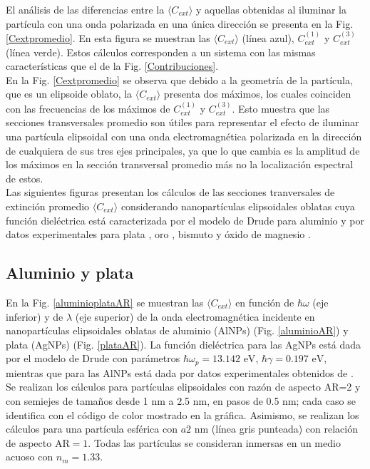 El análisis de las diferencias entre la $\langle C_{ext}\rangle$ y aquellas obtenidas al iluminar la partícula con una onda polarizada en una única dirección se presenta en la Fig. \ref{Cextpromedio}. En esta figura se muestran las $\langle C_{ext}\rangle$ (línea azul), $C_{ext}^{(1)}$ y $C_{ext}^{(3)}$ (línea verde). Estos cálculos corresponden a un sistema con las mismas características que el de la Fig. \ref{Contribuciones}.\\

En la Fig. \ref{Cextpromedio} se observa que debido a la geometría de la partícula, que es un elipsoide oblato, la 
$\langle C_{ext}\rangle$ presenta dos máximos, los cuales coinciden con las frecuencias de los máximos de $C_{ext}^{(1)}$ y $C_{ext}^{(3)}$. Esto muestra que las secciones transversales promedio son útiles para representar el efecto de iluminar una partícula elipsoidal con una onda electromagnética polarizada en la dirección de cualquiera de sus tres ejes principales, ya que lo que cambia es la amplitud de los máximos en la sección transversal promedio más no la localización espectral de estos. \\

Las siguientes figuras presentan los cálculos de las secciones tranversales de extinción promedio  $\langle C_{ext}\rangle$ considerando nanopartículas elipsoidales oblatas cuya función dieléctrica está caracterizada por el modelo de Drude para aluminio \cite{Aluminio} y por datos experimentales para plata \cite{Plata}, oro \cite{Plata}, bismuto \cite{Bismuto} y  óxido de magnesio \cite{MgO}.


\subsection*{Aluminio y plata}
En la Fig. \ref{aluminioplataAR} se muestran las $\langle C_{ext}\rangle$ en función de $\hbar\omega$ (eje inferior) y de  $\lambda$ (eje superior) de la onda electromagnética incidente en nanopartículas elipsoidales oblatas de aluminio (AlNPs) (Fig. \ref{aluminioAR}) y plata (AgNPs) (Fig. \ref{plataAR}). La función dieléctrica para las AgNPs está dada por el modelo de Drude con parámetros $\hbar\omega_p=13.142\text{ eV}$, $\hbar\gamma=0.197\text{ eV}$, mientras que para las AlNPs  está dada por datos experimentales obtenidos de \cite{Plata}. Se realizan los cálculos para partículas elipsoidales con razón de aspecto AR=2 y con semiejes de tamaños desde 1 nm a 2.5 nm, en pasos de 0.5 nm; cada caso se identifica con el código de color mostrado en la gráfica. Asimismo, se realizan los cálculos para una partícula esférica con $a2 \text{ nm}$ (línea gris punteada) con relación de aspecto AR$=1$. Todas las partículas se consideran inmersas en un medio acuoso con $n_m=1.33$.\\

